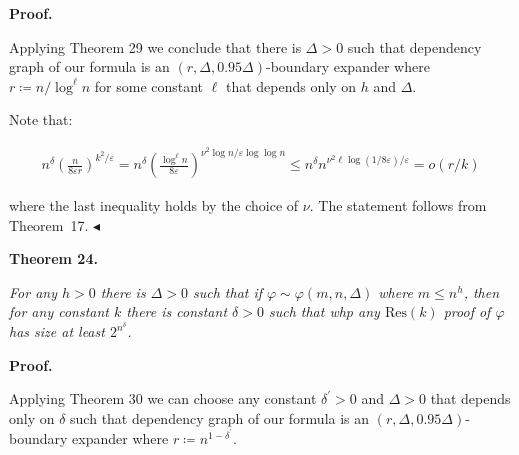 \documentclass[10pt,a4paper]{article}
\begin{document}
\par\medskip\noindent\textbf{Proof.}\par




Applying Theorem 29 we conclude that there is $\Delta>0$ such that
dependency graph of our formula is an $(r,\Delta,0.95\Delta)$-boundary expander where $r\coloneqq n/\log^{\ell}n$ for some constant $\ell$ that depends only on $h$ and $\Delta$.\par




Note that:\par


\[\begin{gathered}
n^{\delta}\left(\frac{n}{8\varepsilon r}\right)^{k^{2}/\varepsilon}=n^{\delta}%
\left(\frac{\log^{\ell}n}{8\varepsilon}\right)^{\nu^{2}\log n/\varepsilon\log%
\log n}\leq n^{\delta}n^{\nu^{2}\ell\log(1/8\varepsilon)/\varepsilon}=o(r/k)
\end{gathered}\]


where the last inequality holds by the choice of $\nu$. The statement follows from Theorem 17.
$\blacktriangleleft$\par





\par\medskip\noindent\textbf{
\textbf{Theorem 24}\textbf{.}
}\par



\emph{For any $h>0$ there is $\Delta>0$ such that if $\varphi\sim\varphi(m,n,\Delta)$ where
$m\leq n^{h}$, then for any constant $k$ there is constant $\delta>0$ such that whp any $\mathrm{Res}(k)$
proof of $\varphi$ has size at least $2^{n^{\delta}}$.}\par







\par\medskip\noindent\textbf{Proof.}\par




Applying Theorem 30 we can choose any constant $\delta^{\prime}>0$ and $\Delta>0$
that depends only on $\delta$ such that dependency graph of our formula is an $(r,\Delta,0.95\Delta)$-boundary expander where $r\coloneqq n^{1-\delta^{\prime}}$.\par
\end{document}
